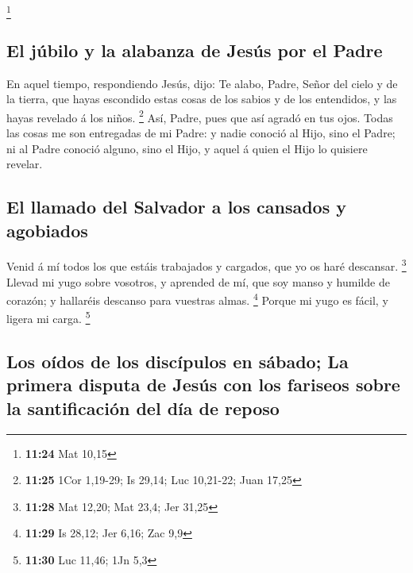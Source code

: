 \footnote{\textbf{11:24} Mat 10,15}

\hypertarget{el-juxfabilo-y-la-alabanza-de-jesuxfas-por-el-padre}{%
\subsection{El júbilo y la alabanza de Jesús por el
Padre}\label{el-juxfabilo-y-la-alabanza-de-jesuxfas-por-el-padre}}

 En aquel tiempo, respondiendo Jesús, dijo: Te alabo,
Padre, Señor del cielo y de la tierra, que hayas escondido estas cosas
de los sabios y de los entendidos, y las hayas revelado á los niños.
\footnote{\textbf{11:25} 1Cor 1,19-29; Is 29,14; Luc 10,21-22; Juan
  17,25}  Así, Padre, pues que así agradó en tus ojos.
 Todas las cosas me son entregadas de mi Padre: y nadie
conoció al Hijo, sino el Padre; ni al Padre conoció alguno, sino el
Hijo, y aquel á quien el Hijo lo quisiere revelar.

\hypertarget{el-llamado-del-salvador-a-los-cansados-y-agobiados}{%
\subsection{El llamado del Salvador a los cansados
\hspace{0pt}\hspace{0pt}y
agobiados}\label{el-llamado-del-salvador-a-los-cansados-y-agobiados}}

 Venid á mí todos los que estáis trabajados y cargados, que
yo os haré descansar. \footnote{\textbf{11:28} Mat 12,20; Mat 23,4; Jer
  31,25}  Llevad mi yugo sobre vosotros, y aprended de mí,
que soy manso y humilde de corazón; y hallaréis descanso para vuestras
almas. \footnote{\textbf{11:29} Is 28,12; Jer 6,16; Zac 9,9}
 Porque mi yugo es fácil, y ligera mi carga. \footnote{\textbf{11:30}
  Luc 11,46; 1Jn 5,3}

\hypertarget{los-ouxeddos-de-los-discuxedpulos-en-suxe1bado-la-primera-disputa-de-jesuxfas-con-los-fariseos-sobre-la-santificaciuxf3n-del-duxeda-de-reposo}{%
\subsection{Los oídos de los discípulos en sábado; La primera disputa de
Jesús con los fariseos sobre la santificación del día de
reposo}\label{los-ouxeddos-de-los-discuxedpulos-en-suxe1bado-la-primera-disputa-de-jesuxfas-con-los-fariseos-sobre-la-santificaciuxf3n-del-duxeda-de-reposo}}

